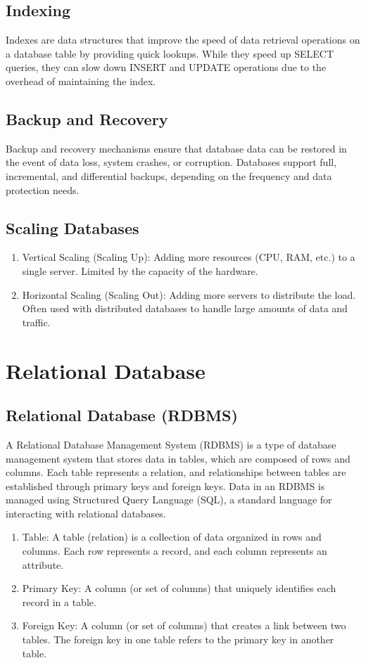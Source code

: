 \documentclass[openany]{book} %
\begin{document}
\section{Indexing}
Indexes are data structures that improve the speed of data retrieval operations on a database table by providing quick lookups. While they speed up SELECT queries, they can slow down INSERT and UPDATE operations due to the overhead of maintaining the index.

\section{Backup and Recovery}
Backup and recovery mechanisms ensure that database data can be restored in the event of data loss, system crashes, or corruption. Databases support full, incremental, and differential backups, depending on the frequency and data protection needs.

\section{Scaling Databases}
\begin{enumerate}
    \item Vertical Scaling (Scaling Up): Adding more resources (CPU, RAM, etc.) to a single server. Limited by the capacity of the hardware.
    \item Horizontal Scaling (Scaling Out): Adding more servers to distribute the load. Often used with distributed databases to handle large amounts of data and traffic.
\end{enumerate}

\chapter{Relational Database}
\section{Relational Database (RDBMS)}
A Relational Database Management System (RDBMS) is a type of database management system that stores data in tables, which are composed of rows and columns. Each table represents a relation, and relationships between tables are established through primary keys and foreign keys. Data in an RDBMS is managed using Structured Query Language (SQL), a standard language for interacting with relational databases.
\begin{enumerate}
    \item Table: A table (relation) is a collection of data organized in rows and columns. Each row represents a record, and each column represents an attribute.
    \item Primary Key: A column (or set of columns) that uniquely identifies each record in a table.
    \item Foreign Key: A column (or set of columns) that creates a link between two tables. The foreign key in one table refers to the primary key in another table.
\end{enumerate}
\end{document}
